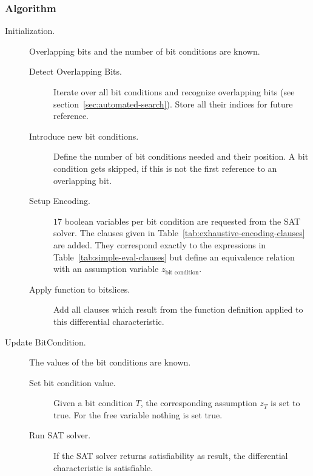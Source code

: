 \subsubsection{Algorithm}
\label{sec:exhaustive-encoding-algorithm}
%
\begin{description}
  \item[Initialization.] Overlapping bits and the number of bit conditions are known.
    \begin{description}
      \item[Detect Overlapping Bits.] Iterate over all bit conditions and recognize overlapping bits (see section~\ref{sec:automated-search}). Store all their indices for future reference.
      \item[Introduce new bit conditions.] Define the number of bit conditions needed and their position. A bit condition gets skipped, if this is not the first reference to an overlapping bit.
      \item[Setup Encoding.] $17$ boolean variables per bit condition are requested from the SAT solver. The clauses given in Table~\ref{tab:exhaustive-encoding-clauses} are added. They correspond exactly to the expressions in Table~\ref{tab:simple-eval-clauses} but define an equivalence relation with an assumption variable $z_{\text{bit condition}}$.
      \item[Apply function to bitslices.] Add all clauses which result from the function definition applied to this differential characteristic.
    \end{description}
  \item[Update BitCondition.] The values of the bit conditions are known.
    \begin{description}
      \item[Set bit condition value.] Given a bit condition $T$, the corresponding assumption $z_T$ is set to true. For the free variable nothing is set true.
      \item[Run SAT solver.] If the SAT solver returns satisfiability as result, the differential characteristic is satisfiable.
    \end{description}
\end{description}

